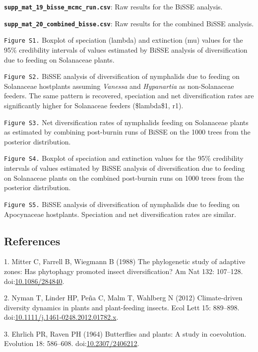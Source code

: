 \documentclass[]{article}
\begin{document}
\textbf{\texttt{supp\_mat\_19\_bisse\_mcmc\_run.csv}}: Raw results for
the BiSSE analysis.

\textbf{\texttt{supp\_mat\_20\_combined\_bisse.csv}}: Raw results for
the combined BiSSE analysis.

\texttt{Figure S1.} Boxplot of speciation (lambda) and extinction (mu)
values for the 95\% credibility intervals of values estimated by BiSSE
analysis of diversification due to feeding on Solanaceae plants.

\texttt{Figure S2.} BiSSE analysis of diversification of nymphalids due
to feeding on Solanaceae hostplants assuming \emph{Vanessa} and
\emph{Hypanartia} as non-Solanaceae feeders. The same pattern is
recovered, speciation and net diversification rates are significantly
higher for Solanaceae feeders (\$lambda\$1, r1).

\texttt{Figure S3.} Net diversification rates of nymphalids feeding on
Solanaceae plants as estimated by combining post-burnin runs of BiSSE on
the 1000 trees from the posterior distribution.

\texttt{Figure S4.} Boxplot of speciation and extinction values for the
95\% credibility intervals of values estimated by BiSSE analysis of
diversification due to feeding on Solanaceae plants on the combined
post-burnin runs on 1000 trees from the posterior distribution.

\texttt{Figure S5.} BiSSE analysis of diversification of nymphalids due
to feeding on Apocynaceae hostplants. Speciation and net diversification
rates are similar.

\subsection*{References}\label{references}

1. Mitter C, Farrell B, Wiegmann B (1988) The phylogenetic study of
adaptive zones: Has phytophagy promoted insect diversification? Am Nat
132: 107--128.
doi:\href{http://dx.doi.org/10.1086/284840}{10.1086/284840}.

2. Nyman T, Linder HP, Peña C, Malm T, Wahlberg N (2012) Climate-driven
diversity dynamics in plants and plant-feeding insects. Ecol Lett 15:
889--898.
doi:\href{http://dx.doi.org/10.1111/j.1461-0248.2012.01782.x}{10.1111/j.1461-0248.2012.01782.x}.

3. Ehrlich PR, Raven PH (1964) Butterflies and plants: A study in
coevolution. Evolution 18: 586--608.
doi:\href{http://dx.doi.org/10.2307/2406212}{10.2307/2406212}.
\end{document}
